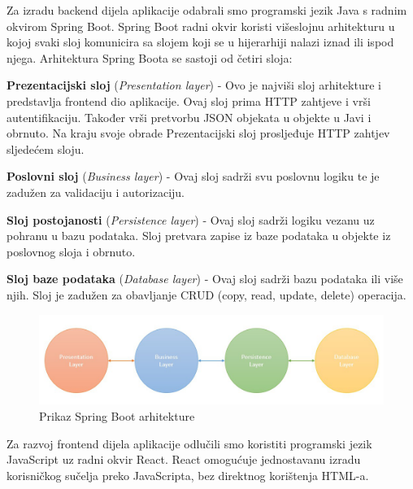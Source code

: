 		Za izradu backend dijela aplikacije odabrali smo programski jezik Java s radnim okvirom Spring Boot. Spring Boot radni okvir koristi višeslojnu arhitekturu u kojoj svaki sloj komunicira sa slojem koji se u hijerarhiji nalazi iznad ili ispod njega. Arhitektura Spring Boota se sastoji od četiri sloja:
		\begin{packed_item}
			\item \textbf{Prezentacijski sloj} (\textit{Presentation layer}) - Ovo je najviši sloj arhitekture i predstavlja frontend dio aplikacije. Ovaj sloj prima HTTP zahtjeve i vrši autentifikaciju. Također vrši pretvorbu JSON objekata u objekte u Javi i obrnuto. Na kraju svoje obrade Prezentacijski sloj prosljeđuje HTTP zahtjev sljedećem sloju.
			
			\item \textbf{Poslovni sloj} (\textit{Business layer}) - Ovaj sloj sadrži svu poslovnu logiku te je zadužen za validaciju i autorizaciju.
			
			\item \textbf{Sloj postojanosti} (\textit{Persistence layer}) - Ovaj sloj sadrži logiku vezanu uz pohranu u bazu podataka. Sloj pretvara zapise iz baze podataka u objekte iz poslovnog sloja i obrnuto.
			
			\item \textbf{Sloj baze podataka} (\textit{Database layer}) - Ovaj sloj sadrži 	bazu podataka ili više njih. Sloj je zadužen za obavljanje CRUD (copy, read, update, delete) operacija.
		\end{packed_item}
		
		\begin{figure}[H]
			\includegraphics[width=\textwidth]{slike/slojeviArhitekture.jpg} %
			\caption{Prikaz Spring Boot arhitekture}
			\label{fig:MVC1} %
		\end{figure}
		
		Za razvoj frontend dijela aplikacije odlučili smo koristiti programski jezik JavaScript uz radni okvir React. React omogućuje jednostavanu izradu korisničkog sučelja preko JavaScripta, bez direktnog korištenja HTML-a.
		
